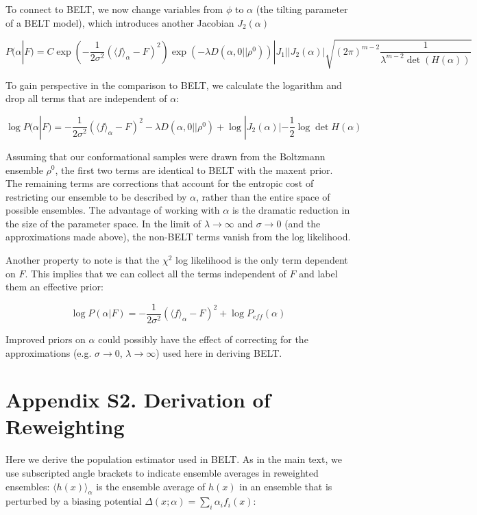 \documentclass[12pt]{article}
\begin{document}
To connect to BELT, we now change variables from $\phi$ to $\alpha$ (the tilting parameter of a BELT model), which introduces another Jacobian $J_2(\alpha)$

$$P(\alpha | F) = C \exp(-\frac{1}{2\sigma^2} (\langle f \rangle_\alpha - F)^2) \exp(-\lambda  D(\alpha, 0|| \rho^0)) |J_1|  |J_2(\alpha)|  \sqrt{(2\pi)^{m-2} \frac{1}{\lambda^{m-2} \det (H(\alpha))}}$$

To gain perspective in the comparison to BELT, we calculate the logarithm and drop all terms that are independent of $\alpha$:

$$\log P(\alpha | F) = -\frac{1}{2\sigma^2} (\langle f \rangle_\alpha - F)^2 -\lambda  D(\alpha, 0|| \rho^0) + \log |J_2(\alpha)| - \frac{1}{2} \log \det H(\alpha)$$

Assuming that our conformational samples were drawn from the Boltzmann ensemble $\rho^0$, the first two terms are identical to BELT with the maxent prior.  The remaining terms are corrections that account for the entropic cost of restricting our ensemble to be described by $\alpha$, rather than the entire space of possible ensembles.  The advantage of working with $\alpha$ is the dramatic reduction in the size of the parameter space.  In the limit of $\lambda \rightarrow \infty$ and $\sigma \rightarrow 0$ (and the approximations made above), the non-BELT terms vanish from the log likelihood.  

Another property to note is that the $\chi^2$ log likelihood is the only term dependent on $F$.  This implies that we can collect all the terms independent of $F$ and label them an effective prior:

$$\log P(\alpha | F) = -\frac{1}{2\sigma^2} (\langle f \rangle_\alpha - F)^2 + \log P_{eff}(\alpha)$$

Improved priors on $\alpha$ could possibly have the effect of correcting for the approximations (e.g. $\sigma\rightarrow 0$, $\lambda \rightarrow \infty$) used here in deriving BELT.   

\section*{Appendix S2.  Derivation of Reweighting}

Here we derive the population estimator used in BELT.  As in the main text, we use subscripted angle brackets to indicate ensemble averages in reweighted ensembles: $\langle h(x)\rangle _\alpha$ is the ensemble average of $h(x)$ in an ensemble that is perturbed by a biasing potential $\Delta (x;\alpha) = \sum_i \alpha_i f_i(x)$:
\end{document}
